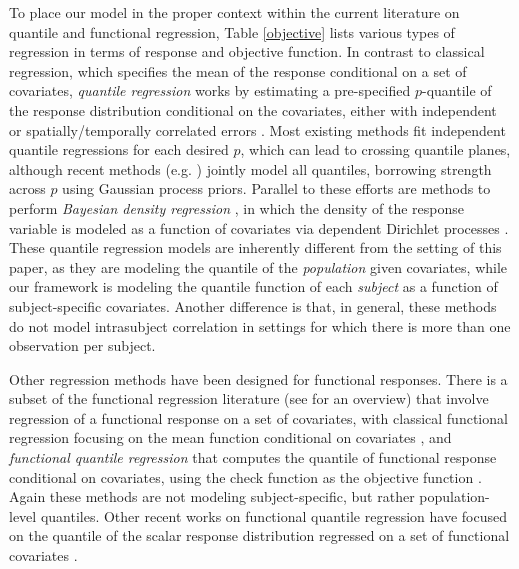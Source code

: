 \documentclass[11pt]{article}
\begin{document}
To place our model in the proper context within the current literature on quantile and functional regression, Table \ref{objective} lists various types of regression in terms of response and objective function. 
 In contrast to classical regression, which specifies the mean of the response conditional on a set of covariates, \textit{quantile regression} \cite{he2000quantile,koenker2005quantile,yang2015quantile} 
 works by estimating a pre-specified $p$-quantile of the response distribution conditional on the covariates, either with independent  \cite{koenker2004quantile,hao2007quantile,davino2013quantile} 
  or spatially/temporally correlated errors \cite{koenker2004quantile,reich2012bayesian,reich2012spatiotemporal}.  Most existing methods fit independent quantile regressions for each desired $p$, which can lead
  to crossing quantile planes, although recent methods (e.g. \cite{yang2017joint}) jointly model all quantiles, borrowing strength across $p$ using Gaussian process priors.  Parallel to these efforts are methods to perform \textit{Bayesian density regression} \cite{dunson2007bayesian}, in which the density of the response variable is modeled as a function of covariates via dependent Dirichlet processes  \cite{muller1996bayesian,maceachern1999dependent,griffin2006order,dunson2006bayesian}.
   These quantile regression models are inherently different from the setting of this paper, as they are modeling the quantile of the \textit{population} given covariates, while our framework is modeling the quantile function of each \textit{subject} as a function of subject-specific covariates.  Another difference is that, in general, these methods do not model intrasubject correlation in settings for which there is more than one observation per subject.

Other regression methods have been designed for functional responses.  There is a subset of the functional regression literature (see \cite{morris2015functionalreg} for an overview)
 that involve regression of a functional response on a set of covariates, with classical functional regression focusing on the mean function conditional on covariates 
 \cite{faraway1997regression,wu2000kernel,guo2002functional,ramsay2006functional,morris2006wavelet,reiss2010fast,goldsmith2011functional,goldsmith2011penalized,scheipl2015functional,meyer2015bayesian}, %
 and \textit{functional quantile regression} that computes
 the quantile of functional response conditional on covariates, using
  the check function as the objective function \cite{brockhaus2015functional,brockhaus2015fdboost}.  Again these methods are not modeling subject-specific, but rather population-level quantiles.
Other recent works on functional quantile regression have focused on the quantile of the scalar response distribution regressed on a set of functional covariates  
 \cite{ferraty2005conditional,cardot2005quantile,chen2012conditional,kato2012estimation,kato2012asymptotics,li2016inference}. 
\end{document}
